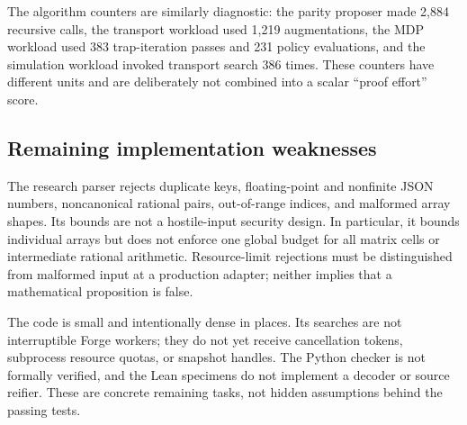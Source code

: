 The algorithm counters are similarly diagnostic: the parity proposer made
2,884 recursive calls, the transport workload used 1,219 augmentations, the
MDP workload used 383 trap-iteration passes and 231 policy evaluations, and
the simulation workload invoked transport search 386 times. These counters
have different units and are deliberately not combined into a scalar
``proof effort'' score.

\subsection{Remaining implementation weaknesses}

The research parser rejects duplicate keys, floating-point and nonfinite JSON
numbers, noncanonical rational pairs, out-of-range indices, and malformed
array shapes. Its bounds are not a hostile-input security design. In
particular, it bounds individual arrays but does not enforce one global budget
for all matrix cells or intermediate rational arithmetic. Resource-limit
rejections must be distinguished from malformed input at a production adapter;
neither implies that a mathematical proposition is false.

The code is small and intentionally dense in places. Its searches are not
interruptible Forge workers; they do not yet receive cancellation tokens,
subprocess resource quotas, or snapshot handles. The Python checker is not
formally verified, and the Lean specimens do not implement a decoder or source
reifier. These are concrete remaining tasks, not hidden assumptions behind the
passing tests.
